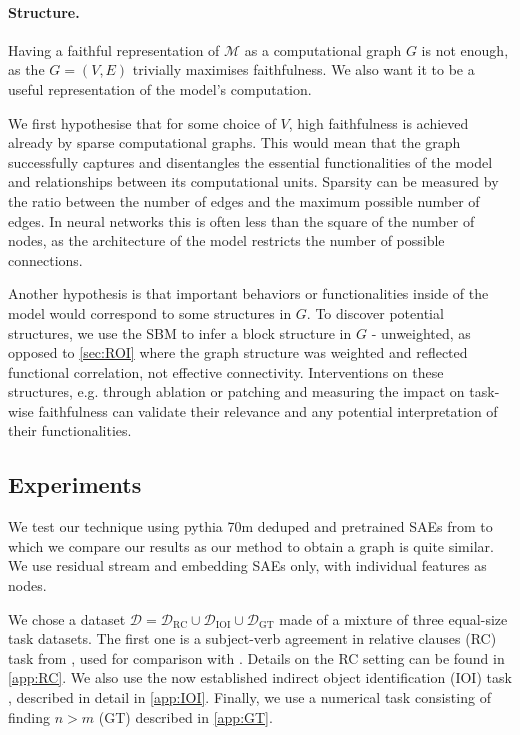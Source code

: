 \documentclass{article}
\begin{document}
\paragraph{Structure.}Having a faithful representation of $\mathcal{M}$ as a computational graph $G$ is not enough, as the $G=(V,E)$ trivially maximises faithfulness. We also want it to be a useful representation of the model's computation.

We first hypothesise that for some choice of $V$, high faithfulness is achieved already by sparse computational graphs. This would mean that the graph successfully captures and disentangles the essential functionalities of the model and relationships between its computational units. Sparsity can be measured by the ratio between the number of edges and the maximum possible number of edges. In neural networks this is often less than the square of the number of nodes, as the architecture of the model restricts the number of possible connections.

Another hypothesis is that important behaviors or functionalities inside of the model would correspond to some structures in $G$. To discover potential structures, we use the SBM to infer a block structure in $G$ - unweighted, as opposed to \cref{sec:ROI} where the graph structure was weighted and reflected functional correlation, not effective connectivity. Interventions on these structures, e.g. through ablation or patching and measuring the impact on task-wise faithfulness can validate their relevance and any potential interpretation of their functionalities.

\subsection{Experiments}
\label{sec:computational_graphs_exp}

We test our technique using pythia 70m deduped \citep{biderman2023pythiasuiteanalyzinglarge} and pretrained SAEs from \citet{marks2024sparseCircuits} to which we compare our results as our method to obtain a graph is quite similar. We use residual stream and embedding SAEs only, with individual features as nodes.

We chose a dataset $\mathcal{D} = \mathcal{D}_{\mathrm{RC}} \cup \mathcal{D}_{\mathrm{IOI}} \cup \mathcal{D}_{\mathrm{GT}}$ made of a mixture of three equal-size task datasets. The first one is a subject-verb agreement in relative clauses (RC) task from \citet{finlayson-etal-2021-causal}, used for comparison with \citet{marks2024sparseCircuits}. Details on the RC setting can be found in \cref{app:RC}. We also use the now established indirect object identification (IOI) task \citep{wang2022interpretabilityCircuits}, described in detail in \cref{app:IOI}. Finally, we use a numerical task consisting of finding $n > m$ (GT) described in \cref{app:GT}.\\
\end{document}

